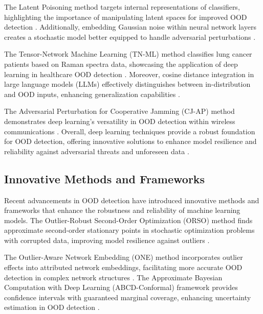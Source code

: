 The Latent Poisoning method targets internal representations of classifiers, highlighting the importance of manipulating latent spaces for improved OOD detection \cite{creswell2017latentpoisonadversarialattacks}. Additionally, embedding Gaussian noise within neural network layers creates a stochastic model better equipped to handle adversarial perturbations \cite{arous2023noiseyouadversarialtraining}.

The Tensor-Network Machine Learning (TN-ML) method classifies lung cancer patients based on Raman spectra data, showcasing the application of deep learning in healthcare OOD detection \cite{an2023intelligentdiagnosticschemelung}. Moreover, cosine distance integration in large language models (LLMs) effectively distinguishes between in-distribution and OOD inputs, enhancing generalization capabilities \cite{HowGoodAre3}.

The Adversarial Perturbation for Cooperative Jamming (CJ-AP) method demonstrates deep learning's versatility in OOD detection within wireless communications \cite{kim2020make5gcommunicationsinvisible}. Overall, deep learning techniques provide a robust foundation for OOD detection, offering innovative solutions to enhance model resilience and reliability against adversarial threats and unforeseen data \cite{debicha2021adversarialtrainingdeeplearningbased}.

\subsection{Innovative Methods and Frameworks} \label{subsec:Innovative Methods and Frameworks}

Recent advancements in OOD detection have introduced innovative methods and frameworks that enhance the robustness and reliability of machine learning models. The Outlier-Robust Second-Order Optimization (ORSO) method finds approximate second-order stationary points in stochastic optimization problems with corrupted data, improving model resilience against outliers \cite{li2024robustsecondordernonconvexoptimization}.

The Outlier-Aware Network Embedding (ONE) method incorporates outlier effects into attributed network embeddings, facilitating more accurate OOD detection in complex network structures \cite{bandyopadhyay2018outlierawarenetworkembedding}. The Approximate Bayesian Computation with Deep Learning (ABCD-Conformal) framework provides confidence intervals with guaranteed marginal coverage, enhancing uncertainty estimation in OOD detection \cite{baragatti2024approximatebayesiancomputationdeep}.

